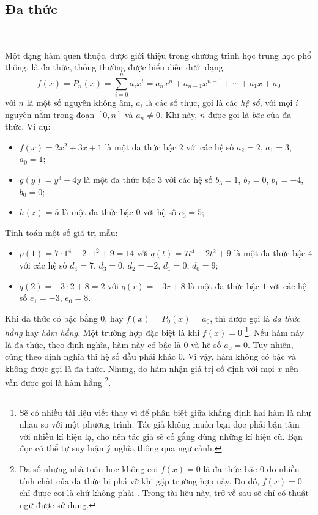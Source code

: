 \subsection{Đa thức}

\ %

Một dạng hàm quen thuộc, được giới thiệu trong chương trình học trung học phổ thông, là đa thức, thông thường được biểu diễn dưới dạng $$f(x)=P_n(x)=\sum_{i = 0}^n a_i x^i = a_nx^n + a_{n-1}x^{n-1} + \cdots + a_1x + a_0$$ với $n$ là một số nguyên không âm, $a_i$ là các số thực, gọi là các \emph{hệ số}, với mọi $i$ nguyên nằm trong đoạn $[0, n]$ và $a_n \neq 0$. Khi này, $n$ được gọi là \emph{bậc} của đa thức. Ví dụ:
\begin{itemize}
   \item $f(x) = 2x^2 + 3x + 1$ là một đa thức bậc $2$ với các hệ số $a_2 = 2$, $a_1 = 3$, $a_0 = 1$;
   \item $g(y) = y^3 - 4y$ là một đa thức bậc $3$ với các hệ số $b_3 = 1$, $b_2 = 0$, $b_1 = -4$, $b_0 = 0$;
   \item $h(z) = 5$ là một đa thức bậc $0$ với hệ số $c_0 = 5$;
\end{itemize}
Tính toán một số giá trị mẫu:
\begin{itemize}
   \item $p(1) = 7 \cdot 1^4 - 2 \cdot 1^2 + 9 = 14$ với $q(t)= 7t^4 - 2t^2 + 9$ là một đa thức bậc $4$ với các hệ số $d_4 = 7$, $d_3 = 0$, $d_2 = -2$, $d_1 = 0$, $d_0 = 9$;
   \item $q(2) = -3 \cdot 2 + 8 = 2$ với $q(r) = -3r + 8$ là một đa thức bậc $1$ với các hệ số $e_1 = -3$, $e_0 = 8$.
\end{itemize}
Khi đa thức có bậc bằng $0$, hay $f(x) = P_0(x) = a_0$, thì được gọi là \emph{đa thức hằng} hay \emph{hàm hằng}. Một trường hợp đặc biệt là khi $f(x) = 0$ \footnote{Sẽ có nhiều tài liệu viết  thay vì  để phân biệt giữa khẳng định hai hàm là như nhau so với một phương trình. Tác giả không muốn bạn đọc phải bận tâm với nhiều kí hiệu lạ, cho nên tác giả sẽ cố gắng dùng những kí hiệu cũ. Bạn đọc có thể tự suy luận ý nghĩa thông qua ngữ cảnh.}. Nếu hàm này là đa thức, theo định nghĩa, hàm này có bậc là $0$ và hệ số $a_0 = 0$. Tuy nhiên, cũng theo định nghĩa thì hệ số đầu phải khác $0$. Vì vậy, hàm không có bậc và không được gọi là đa thức. Nhưng, do hàm nhận giá trị cố định với mọi $x$ nên vẫn được gọi là hàm hằng \footnote{Đa số những nhà toán học không coi $f(x) = 0$ là đa thức bậc $0$ do nhiều tính chất của đa thức bị phá vỡ khi gặp trường hợp này. Do đó, $f(x) = 0$ chỉ được coi là  chứ không phải . Trong tài liệu này, trở về sau sẽ chỉ có thuật ngữ  được sử dụng.}.

